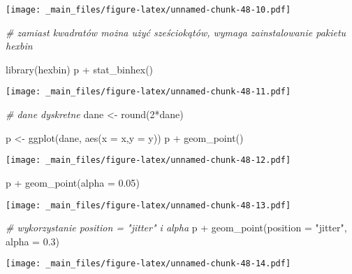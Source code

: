 \documentclass[
]{book}
\newenvironment{Shaded}{\begin{snugshade}}{\end{snugshade}}
\newcommand{\AttributeTok}[1]{\textcolor[rgb]{0.77,0.63,0.00}{#1}}
\newcommand{\CommentTok}[1]{\textcolor[rgb]{0.56,0.35,0.01}{\textit{#1}}}
\newcommand{\DecValTok}[1]{\textcolor[rgb]{0.00,0.00,0.81}{#1}}
\newcommand{\FloatTok}[1]{\textcolor[rgb]{0.00,0.00,0.81}{#1}}
\newcommand{\FunctionTok}[1]{\textcolor[rgb]{0.00,0.00,0.00}{#1}}
\newcommand{\NormalTok}[1]{#1}
\newcommand{\OtherTok}[1]{\textcolor[rgb]{0.56,0.35,0.01}{#1}}
\newcommand{\SpecialCharTok}[1]{\textcolor[rgb]{0.00,0.00,0.00}{#1}}
\newcommand{\StringTok}[1]{\textcolor[rgb]{0.31,0.60,0.02}{#1}}
\begin{document}
\texttt{[image: \_main\_files/figure-latex/unnamed-chunk-48-10.pdf]}

\begin{Shaded}
\begin{Highlighting}[]
\CommentTok{\# zamiast kwadratów można użyć sześciokątów, wymaga zainstalowanie pakietu hexbin}

\FunctionTok{library}\NormalTok{(hexbin)}
\NormalTok{p }\SpecialCharTok{+} \FunctionTok{stat\_binhex}\NormalTok{()}
\end{Highlighting}
\end{Shaded}

\texttt{[image: \_main\_files/figure-latex/unnamed-chunk-48-11.pdf]}

\begin{Shaded}
\begin{Highlighting}[]
\CommentTok{\# dane dyskretne}
\NormalTok{dane }\OtherTok{\textless{}{-}} \FunctionTok{round}\NormalTok{(}\DecValTok{2}\SpecialCharTok{*}\NormalTok{dane)}

\NormalTok{p }\OtherTok{\textless{}{-}} \FunctionTok{ggplot}\NormalTok{(dane, }\FunctionTok{aes}\NormalTok{(}\AttributeTok{x =}\NormalTok{ x,}\AttributeTok{y =}\NormalTok{ y))}
\NormalTok{p }\SpecialCharTok{+} \FunctionTok{geom\_point}\NormalTok{()}
\end{Highlighting}
\end{Shaded}

\texttt{[image: \_main\_files/figure-latex/unnamed-chunk-48-12.pdf]}

\begin{Shaded}
\begin{Highlighting}[]
\NormalTok{p }\SpecialCharTok{+} \FunctionTok{geom\_point}\NormalTok{(}\AttributeTok{alpha =} \FloatTok{0.05}\NormalTok{)}
\end{Highlighting}
\end{Shaded}

\texttt{[image: \_main\_files/figure-latex/unnamed-chunk-48-13.pdf]}

\begin{Shaded}
\begin{Highlighting}[]
\CommentTok{\# wykorzystanie position = "jitter" i alpha}
\NormalTok{p }\SpecialCharTok{+} \FunctionTok{geom\_point}\NormalTok{(}\AttributeTok{position =} \StringTok{"jitter"}\NormalTok{, }\AttributeTok{alpha =} \FloatTok{0.3}\NormalTok{)}
\end{Highlighting}
\end{Shaded}

\texttt{[image: \_main\_files/figure-latex/unnamed-chunk-48-14.pdf]}
\end{document}
